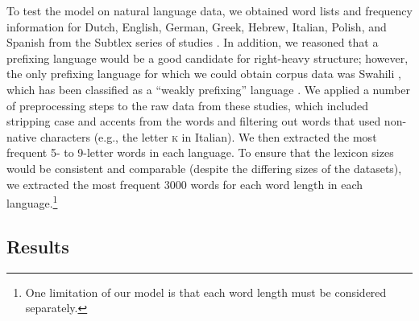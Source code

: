 \documentclass[doc,biblatex]{apa7}
\begin{document}
To test the model on natural language data, we obtained word lists and frequency information for Dutch, English, German, Greek, Hebrew, Italian, Polish, and Spanish from the Subtlex series of studies \parencite{Brysbaert:2009, Brysbaert:2011, Crepaldi:2015, Cuetos:2011, Dimitropoulou:2010, Keuleers:2010, Mandera:2014, VanParidon:2021}. In addition, we reasoned that a prefixing language would be a good candidate for right-heavy structure; however, the only prefixing language for which we could obtain corpus data was Swahili \parencite{Hurskainen:2016}, which has been classified as a ``weakly prefixing'' language \parencite{wals-26}. We applied a number of preprocessing steps to the raw data from these studies, which included stripping case and accents from the words and filtering out words that used non-native characters (e.g., the letter \textsc{k} in Italian). We then extracted the most frequent 5- to 9-letter words in each language. To ensure that the lexicon sizes would be consistent and comparable (despite the differing sizes of the datasets), we extracted the most frequent 3000 words for each word length in each language.\footnote{One limitation of our model is that each word length must be considered separately.}

\subsection{Results}
\end{document}
